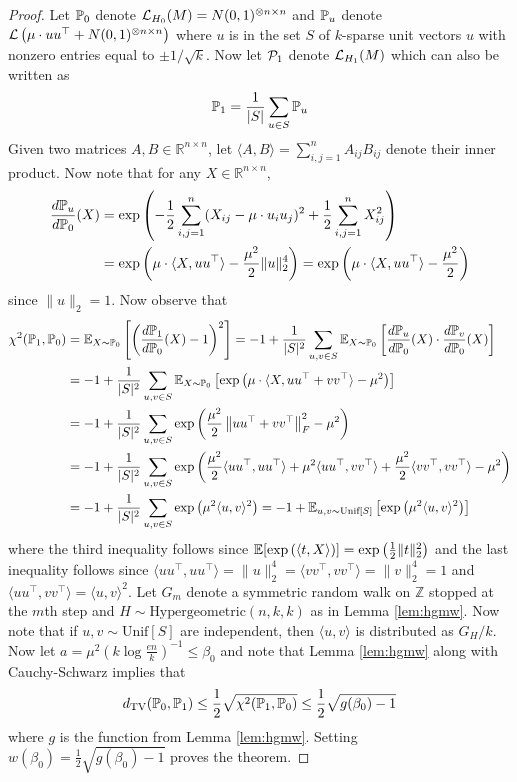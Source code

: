 \begin{proof}
Let $\mathbb{P}_0$ denote $\mathcal{L}_{H_0}(M) = N(0, 1)^{\otimes n \times n}$ and $\mathbb{P}_u$ denote $\mathcal{L}\left( \mu \cdot uu^\top + N(0, 1)^{\otimes n \times n} \right)$ where $u$ is in the set $S$ of $k$-sparse unit vectors $u$ with nonzero entries equal to $\pm 1/\sqrt{k}$. Now let $\mathcal{P}_1$ denote $\mathcal{L}_{H_1}(M)$ which can also be written as
$$\mathbb{P}_1 = \frac{1}{|S|} \sum_{u \in S} \mathbb{P}_u$$
Given two matrices $A, B \in \mathbb{R}^{n \times n}$, let $\langle A, B \rangle = \sum_{i, j = 1}^n A_{ij} B_{ij}$ denote their inner product. Now note that for any $X \in \mathbb{R}^{n \times n}$,
\begin{align*}
\frac{d\mathbb{P}_u}{d\mathbb{P}_0}(X) &= \exp\left( - \frac{1}{2} \sum_{i, j = 1}^n (X_{ij} - \mu \cdot u_i u_j)^2 + \frac{1}{2} \sum_{i, j = 1}^n X_{ij}^2 \right) \\
&= \exp\left( \mu \cdot \langle X, uu^\top \rangle - \frac{\mu^2}{2} \| u \|_2^4 \right) = \exp\left( \mu \cdot \langle X, uu^\top \rangle - \frac{\mu^2}{2} \right)
\end{align*}
since $\| u \|_2 = 1$. Now observe that
\begin{align*}
\chi^2(\mathbb{P}_1, \mathbb{P}_0) &= \mathbb{E}_{X \sim \mathbb{P}_0} \left[ \left( \frac{d\mathbb{P}_1}{d\mathbb{P}_0}(X) - 1 \right)^2 \right] = -1 + \frac{1}{|S|^2} \sum_{u, v \in S} \mathbb{E}_{X \sim \mathbb{P}_0} \left[ \frac{d\mathbb{P}_u}{d\mathbb{P}_0}(X) \cdot \frac{d\mathbb{P}_v}{d\mathbb{P}_0}(X) \right] \\
&= -1 + \frac{1}{|S|^2} \sum_{u, v \in S} \mathbb{E}_{X \sim \mathbb{P}_0} \left[ \exp\left( \mu \cdot \langle X, uu^\top + vv^\top \rangle - \mu^2 \right) \right] \\
&= -1 + \frac{1}{|S|^2} \sum_{u, v \in S} \exp\left( \frac{\mu^2}{2} \left\| uu^\top + vv^\top \right\|_F^2 - \mu^2 \right) \\
&= -1 + \frac{1}{|S|^2} \sum_{u, v \in S} \exp\left( \frac{\mu^2}{2} \langle uu^\top, uu^\top \rangle + \mu^2 \langle uu^\top, vv^\top \rangle + \frac{\mu^2}{2} \langle vv^\top, vv^\top \rangle - \mu^2 \right) \\
&= -1 + \frac{1}{|S|^2} \sum_{u, v \in S} \exp\left( \mu^2 \langle u, v \rangle^2 \right) = -1 + \mathbb{E}_{u, v \sim \text{Unif}[S]}\left[ \exp\left( \mu^2 \langle u, v \rangle^2 \right) \right]
\end{align*}
where the third inequality follows since $\mathbb{E}[\exp\left(\langle t, X\rangle \right)] = \exp\left(\frac{1}{2} \| t \|_2^2\right)$ and the last inequality follows since $\langle uu^\top, uu^\top \rangle = \| u\|_2^4 = \langle vv^\top, vv^\top \rangle = \| v \|_2^4 = 1$ and $\langle uu^\top, vv^\top \rangle = \langle u, v \rangle^2$. Let $G_m$ denote a symmetric random walk on $\mathbb{Z}$ stopped at the $m$th step and $H \sim \text{Hypergeometric}(n, k, k)$ as in Lemma \ref{lem:hgmw}. Now note that if $u, v \sim \text{Unif}[S]$ are independent, then $\langle u, v\rangle$ is distributed as $G_H/k$. Now let $a = \mu^2 \left( k \log \frac{en}{k} \right)^{-1} \le \beta_0$ and note that Lemma \ref{lem:hgmw} along with Cauchy-Schwarz implies that
$$d_{\text{TV}}(\mathbb{P}_0, \mathbb{P}_1) \le \frac{1}{2} \sqrt{\chi^2(\mathbb{P}_1, \mathbb{P}_0)} \le \frac{1}{2} \sqrt{g(\beta_0) - 1}$$
where $g$ is the function from Lemma \ref{lem:hgmw}. Setting $w(\beta_0) = \frac{1}{2} \sqrt{g(\beta_0) - 1}$ proves the theorem.
\end{proof}

